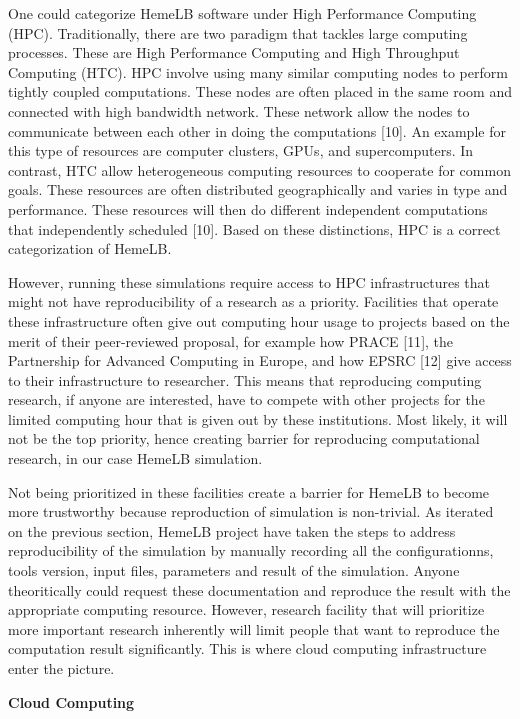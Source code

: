 \documentclass[]{article}
\begin{document}
One could categorize HemeLB software under High Performance Computing
(HPC). Traditionally, there are two paradigm that tackles large
computing processes. These are High Performance Computing and High
Throughput Computing (HTC). HPC involve using many similar computing
nodes to perform tightly coupled computations. These nodes are often
placed in the same room and connected with high bandwidth network. These
network allow the nodes to communicate between each other in doing the
computations {[}10{]}. An example for this type of resources are
computer clusters, GPUs, and supercomputers. In contrast, HTC allow
heterogeneous computing resources to cooperate for common goals. These
resources are often distributed geographically and varies in type and
performance. These resources will then do different independent
computations that independently scheduled {[}10{]}. Based on these
distinctions, HPC is a correct categorization of HemeLB.

However, running these simulations require access to HPC infrastructures
that might not have reproducibility of a research as a priority.
Facilities that operate these infrastructure often give out computing
hour usage to projects based on the merit of their peer-reviewed
proposal, for example how PRACE {[}11{]}, the Partnership for Advanced
Computing in Europe, and how EPSRC {[}12{]} give access to their
infrastructure to researcher. This means that reproducing computing
research, if anyone are interested, have to compete with other projects
for the limited computing hour that is given out by these institutions.
Most likely, it will not be the top priority, hence creating barrier for
reproducing computational research, in our case HemeLB simulation.

Not being prioritized in these facilities create a barrier for HemeLB to
become more trustworthy because reproduction of simulation is
non-trivial. As iterated on the previous section, HemeLB project have
taken the steps to address reproducibility of the simulation by manually
recording all the configurationns, tools version, input files,
parameters and result of the simulation. Anyone theoritically could
request these documentation and reproduce the result with the
appropriate computing resource. However, research facility that will
prioritize more important research inherently will limit people that
want to reproduce the computation result significantly. This is where
cloud computing infrastructure enter the picture.

\textbf{Cloud Computing}
\end{document}
